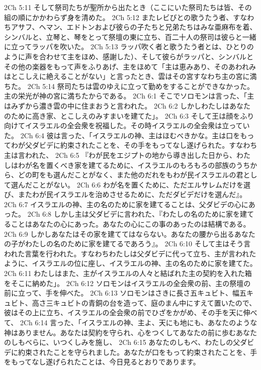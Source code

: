 2Ch 5:11  そして祭司たちが聖所から出たとき（ここにいた祭司たちは皆、その組の順にかかわらず身を清めた。
2Ch 5:12  またレビびとの歌うたう者、すなわちアサフ、ヘマン、エドトンおよび彼らの子たちと兄弟たちはみな亜麻布を着、シンバルと、立琴と、琴をとって祭壇の東に立ち、百二十人の祭司は彼らと一緒に立ってラッパを吹いた。
2Ch 5:13  ラッパ吹く者と歌うたう者とは、ひとりのように声を合わせて主をほめ、感謝した）、そして彼らがラッパと、シンバルとその他の楽器をもって声をふりあげ、主をほめて「主は恵みあり、そのあわれみはとこしえに絶えることがない」と言ったとき、雲はその宮すなわち主の宮に満ちた。
2Ch 5:14  祭司たちは雲のゆえに立って勤めをすることができなかった。主の栄光が神の宮に満ちたからである。
2Ch 6:1  そこでソロモンは言った、「主はみずから濃き雲の中に住まおうと言われた。
2Ch 6:2  しかしわたしはあなたのために高き家、とこしえのみすまいを建てた」。
2Ch 6:3  そして王は顔をふり向けてイスラエルの全会衆を祝福した。その時イスラエルの全会衆は立っていた。
2Ch 6:4  彼は言った、「イスラエルの神、主はほむべきかな。主は口をもってわが父ダビデに約束されたことを、その手をもってなし遂げられた。すなわち主は言われた、
2Ch 6:5  『わが民をエジプトの地から導き出した日から、わたしはわが名を置くべき家を建てるために、イスラエルのもろもろの部族のうちから、どの町をも選んだことがなく、また他のだれをもわが民イスラエルの君として選んだことがない。
2Ch 6:6  わが名を置くために、ただエルサレムだけを選び、またわが民イスラエルを治めさせるために、ただダビデだけを選んだ』。
2Ch 6:7  イスラエルの神、主の名のために家を建てることは、父ダビデの心にあった。
2Ch 6:8  しかし主は父ダビデに言われた、『わたしの名のために家を建てることはあなたの心にあった。あなたの心にこの事のあったのは結構である。
2Ch 6:9  しかしあなたはその家を建ててはならない。あなたの腰から出るあなたの子がわたしの名のために家を建てるであろう』。
2Ch 6:10  そして主はそう言われた言葉を行われた。すなわちわたしは父ダビデに代って立ち、主が言われたように、イスラエルの位に座し、イスラエルの神、主の名のために家を建てた。
2Ch 6:11  わたしはまた、主がイスラエルの人々と結ばれた主の契約を入れた箱をそこに納めた」。
2Ch 6:12  ソロモンはイスラエルの全会衆の前、主の祭壇の前に立って、手を伸べた。
2Ch 6:13  ソロモンはさきに長さ五キュビト、幅五キュビト、高さ三キュビトの青銅の台を造って、庭のまん中にすえて置いたので、彼はその上に立ち、イスラエルの全会衆の前でひざをかがめ、その手を天に伸べて、
2Ch 6:14  言った、「イスラエルの神、主よ、天にも地にも、あなたのような神はありません。あなたは契約を守られ、心をつくしてあなたの前に歩むあなたのしもべらに、いつくしみを施し、
2Ch 6:15  あなたのしもべ、わたしの父ダビデに約束されたことを守られました。あなたが口をもって約束されたことを、手をもってなし遂げられたことは、今日見るとおりであります。

